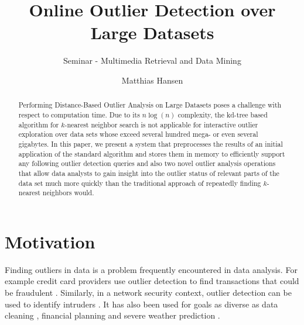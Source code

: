 \documentclass[runningheads]{llncs}
\begin{document}
%
%
%
%
%
\title{Online Outlier Detection over Large Datasets}
\subtitle{Seminar - Multimedia Retrieval and Data Mining}
%
\author{Matthias Hansen}
%
%

\maketitle              %

\begin{abstract}
Performing Distance-Based Outlier Analysis on Large Datasets poses a challenge with respect to computation time. Due to its $n\log(n)$ complexity, the kd-tree based algorithm for $k$-nearest neighbor search is not applicable for interactive outlier exploration over data sets whose exceed several hundred mega- or even several gigabytes. In this paper, we present a system that preprocesses the results of an initial application of the standard algorithm and stores them in memory to efficiently support any following outlier detection queries and also two novel outlier analysis operations that allow data analysts to gain insight into the outlier status of relevant parts of the data set much more quickly than the traditional approach of repeatedly finding $k$-nearest neighbors would.
\end{abstract}
\section{Motivation}
Finding outliers in data is a problem frequently encountered in data analysis. For example credit card providers use outlier detection to find transactions that could be fraudulent \cite{creditfraud}. Similarly, in a network security context, outlier detection can be used to identify intruders \cite{intrusion}. It has also been used for goals as diverse as data cleaning \cite{datacleaning}, financial planning and severe weather prediction \cite{weather}.
\end{document}
